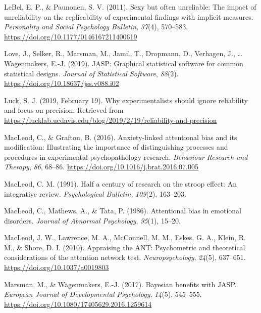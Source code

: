 \documentclass[english,,man,floatsintext]{apa6}
\begin{document}
\leavevmode\hypertarget{ref-lebel_sexy_2011}{}%
LeBel, E. P., \& Paunonen, S. V. (2011). Sexy but often unreliable: The impact of unreliability on the replicability of experimental findings with implicit measures. \emph{Personality and Social Psychology Bulletin}, \emph{37}(4), 570--583. \url{https://doi.org/10.1177/0146167211400619}

\leavevmode\hypertarget{ref-love_jasp:_2019}{}%
Love, J., Selker, R., Marsman, M., Jamil, T., Dropmann, D., Verhagen, J., \ldots{} Wagenmakers, E.-J. (2019). JASP: Graphical statistical software for common statistical designs. \emph{Journal of Statistical Software}, \emph{88}(2). \url{https://doi.org/10.18637/jss.v088.i02}

\leavevmode\hypertarget{ref-luck_why_2019}{}%
Luck, S. J. (2019, February 19). Why experimentalists should ignore reliability and focus on precision. Retrieved from \url{https://lucklab.ucdavis.edu/blog/2019/2/19/reliability-and-precision}

\leavevmode\hypertarget{ref-macleod_anxiety-linked_2016}{}%
MacLeod, C., \& Grafton, B. (2016). Anxiety-linked attentional bias and its modification: Illustrating the importance of distinguishing processes and procedures in experimental psychopathology research. \emph{Behaviour Research and Therapy}, \emph{86}, 68--86. \url{https://doi.org/10.1016/j.brat.2016.07.005}

\leavevmode\hypertarget{ref-macleod_half_1991}{}%
MacLeod, C. M. (1991). Half a century of research on the stroop effect: An integrative review. \emph{Psychological Bulletin}, \emph{109}(2), 163--203.

\leavevmode\hypertarget{ref-macleod_attentional_1986}{}%
MacLeod, C., Mathews, A., \& Tata, P. (1986). Attentional bias in emotional disorders. \emph{Journal of Abnormal Psychology}, \emph{95}(1), 15--20.

\leavevmode\hypertarget{ref-macleod_appraising_2010}{}%
MacLeod, J. W., Lawrence, M. A., McConnell, M. M., Eskes, G. A., Klein, R. M., \& Shore, D. I. (2010). Appraising the ANT: Psychometric and theoretical considerations of the attention network test. \emph{Neuropsychology}, \emph{24}(5), 637--651. \url{https://doi.org/10.1037/a0019803}

\leavevmode\hypertarget{ref-marsman_bayesian_2017}{}%
Marsman, M., \& Wagenmakers, E.-J. (2017). Bayesian benefits with JASP. \emph{European Journal of Developmental Psychology}, \emph{14}(5), 545--555. \url{https://doi.org/10.1080/17405629.2016.1259614}
\end{document}

